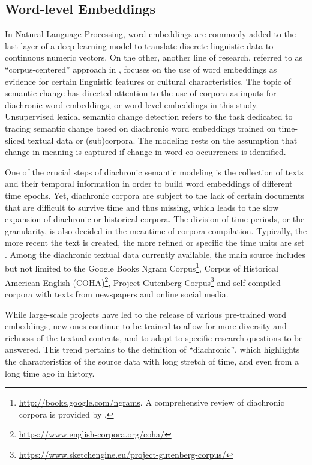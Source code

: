 \subsection{Word-level Embeddings}
In Natural Language Processing, word embeddings are commonly added to the last layer of a deep learning model to translate discrete linguistic data to continuous numeric vectors. On the other, another line of research, referred to as ``corpus-centered'' approach in \textcite{antoniak2018evaluating}, focuses on the use of word embeddings as evidence for certain linguistic features or cultural characteristics. The topic of semantic change has directed attention to the use of corpora as inputs for diachronic word embeddings, or word-level embeddings in this study. Unsupervised lexical semantic change detection refers to the task dedicated to tracing semantic change based on diachronic word embeddings trained on time-sliced textual data or (sub)corpora. The modeling rests on the assumption that change in meaning is captured if change in word co-occurrences is identified.

One of the crucial steps of diachronic semantic modeling is the collection of texts and their temporal information in order to build word embeddings of different time epochs. Yet, diachronic corpora are subject to the lack of certain documents that are difficult to survive time and thus missing, which leads to the slow expansion of diachronic or historical corpora. The division of time periods, or the granularity, is also decided in the meantime of corpora compilation. Typically, the more recent the text is created, the more refined or specific the time units are set \parencite{kutuzov2018survey}. Among the diachronic textual data currently available, the main source includes but not limited to the Google Books Ngram Corpus\footnote{\url{http://books.google.com/ngrams}. A comprehensive review of diachronic corpora is provided by \textcite[38--41]{tahmasebi2018survey}.}, Corpus of Historical American English (COHA)\footnote{\url{https://www.english-corpora.org/coha/}}, Project Gutenberg Corpus\footnote{\url{https://www.sketchengine.eu/project-gutenberg-corpus/}} and self-compiled corpora with texts from newspapers and online social media.

While large-scale projects have led to the release of various pre-trained word embeddings, new ones continue to be trained to allow for more diversity and richness of the textual contents, and to adapt to specific research questions to be answered. This trend pertains to the definition of ``diachronic'', which highlights the characteristics of the source data with long stretch of time, and even from a long time ago in history.

